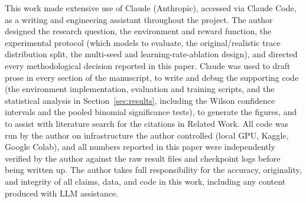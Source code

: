 \documentclass[conference]{IEEEtran}
\begin{document}
This work made extensive use of Claude (Anthropic), accessed via Claude
Code, as a writing and engineering assistant throughout the project. The
author designed the research question, the environment and reward
function, the experimental protocol (which models to evaluate, the
original/realistic trace distribution split, the multi-seed and
learning-rate-ablation design), and directed every methodological decision
reported in this paper. Claude was used to draft prose in every section of
the manuscript, to write and debug the supporting code (the environment
implementation, evaluation and training scripts, and the statistical
analysis in Section~\ref{sec:results}, including the Wilson confidence
intervals and the pooled binomial significance tests), to generate the
figures, and to assist with literature search for the citations in Related
Work. All code was run by the author on infrastructure the author
controlled (local GPU, Kaggle, Google Colab), and all numbers reported in
this paper were independently verified by the author against the raw
result files and checkpoint logs before being written up. The author takes
full responsibility for the accuracy, originality, and integrity of all
claims, data, and code in this work, including any content produced with
LLM assistance.



\end{document}
